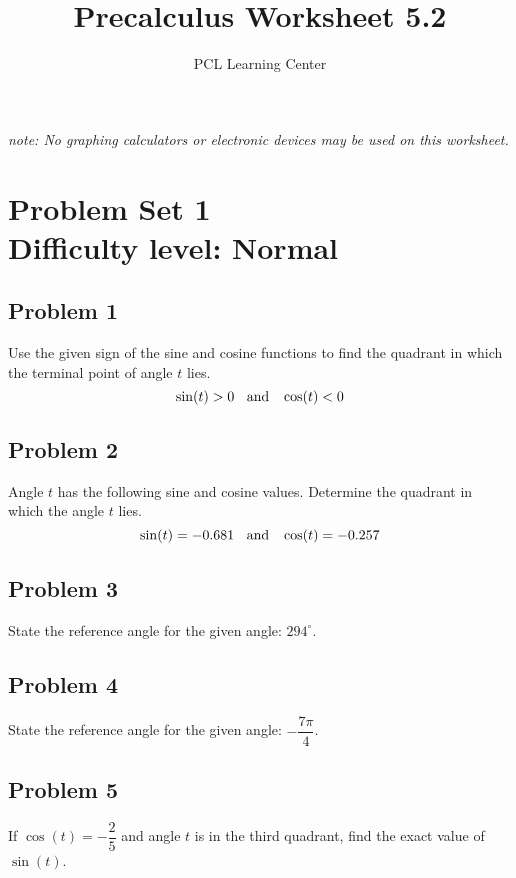 \documentclass[12pt]{article}
\title{Precalculus Worksheet 5.2}
\author{PCL Learning Center}
\date{}
\begin{document}
\maketitle

\begin{center}
    \textit{note: No graphing calculators or electronic devices may be used on this worksheet.}    
\end{center}

\section*{Problem Set 1\\Difficulty level: Normal}
\subsection*{Problem 1}
Use the given sign of the sine and cosine functions to find the quadrant in which the terminal point of angle \(t\) lies.
\[\sin(t)>0 \hspace{0.2cm}\text{ and }\hspace{0.2cm} \cos(t)<0\]

\subsection*{Problem 2}
Angle \(t\) has the following sine and cosine values. Determine the quadrant in which the angle \(t\) lies.
\[\sin(t)=-0.681 \hspace{0.2cm}\text{ and }\hspace{0.2cm} \cos(t)=-0.257\]

\subsection*{Problem 3}
State the reference angle for the given angle: \(294^{\circ}\).

\subsection*{Problem 4}
State the reference angle for the given angle: \(-\dfrac{7\pi}{4}\).\\

\subsection*{Problem 5}
If \(\cos(t)=-\dfrac{2}{5}\) and angle \(t\) is in the third quadrant, find the exact value of \(\sin(t)\).\\
\end{document}
